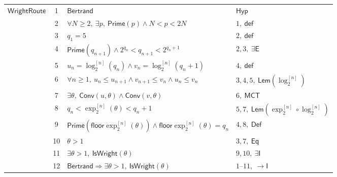 \documentclass[11pt,reqno]{amsart}
\newcommand{\floor}{\mathsf{floor}}
\theoremstyle{blueplain}
\numberwithin{equation}{section}
\begin{document}
{\begin{longtable}{|p{3cm}|c|p{10cm}|p{4cm}|}
	\multirow{12}{*}{$\mathsf{WrightRoute}$} &
	1 & $\mathsf{Bertrand}$ & $\mathsf{Hyp}$\\
	\cline{2-4}
	& 2 & $\forall N\ge2,\ \exists p,\ \mathsf{Prime}(p)\wedge N<p<2N$ & $1,\ \mathsf{def}$\\
	\cline{2-4}
	& 3 & $q_1=5$ & $2,\ \mathsf{def}$\\
	\cline{2-4}
	& 4 & $\mathsf{Prime}(q_{n+1})\wedge 2^{q_n}<q_{n+1}<2^{q_n+1}$ & $2,3,\ \exists\mathsf{E}$\\
	\cline{2-4}
	& 5 & $u_n=\log_2^{[n]}(q_n)\wedge v_n=\log_2^{[n]}(q_n+1)$ & $4,\ \mathsf{def}$\\
	\cline{2-4}
	& 6 & $\forall n\ge1,\ u_n\le u_{n+1}\wedge v_{n+1}\le v_n\wedge u_n\le v_n$ & $3,4,5,\ \mathsf{Lem}(\log_2^{[n]})$\\
	\cline{2-4}
	& 7 & $\exists\theta,\ \mathsf{Conv}(u,\theta)\wedge\mathsf{Conv}(v,\theta)$ & $6,\ \mathsf{MCT}$\\
	\cline{2-4}
	& 8 & $q_n<\exp_2^{[n]}(\theta)<q_n+1$ & $5,7,\ \mathsf{Lem}(\exp_2^{[n]}\circ\log_2^{[n]})$\\
	\cline{2-4}
	& 9 & $\mathsf{Prime}(\floor{\exp_2^{[n]}(\theta)})\wedge\floor{\exp_2^{[n]}(\theta)}=q_n$ & $4,8,\ \mathsf{Def}$\\
	\cline{2-4}
	& 10 & $\theta>1$ & $3,7,\ \mathsf{Eq}$\\
	\cline{2-4}
	& 11 & $\exists\theta>1,\ \mathsf{IsWright}(\theta)$ & $9,10,\ \exists\mathsf{I}$\\
	\cline{2-4}
	& 12 & $\mathsf{Bertrand}\Rightarrow\exists\theta>1,\ \mathsf{IsWright}(\theta)$ & $1\text{--}11,\ \rightarrow\mathsf{I}$\\
	\hline
	

\end{longtable}}
\end{document}
